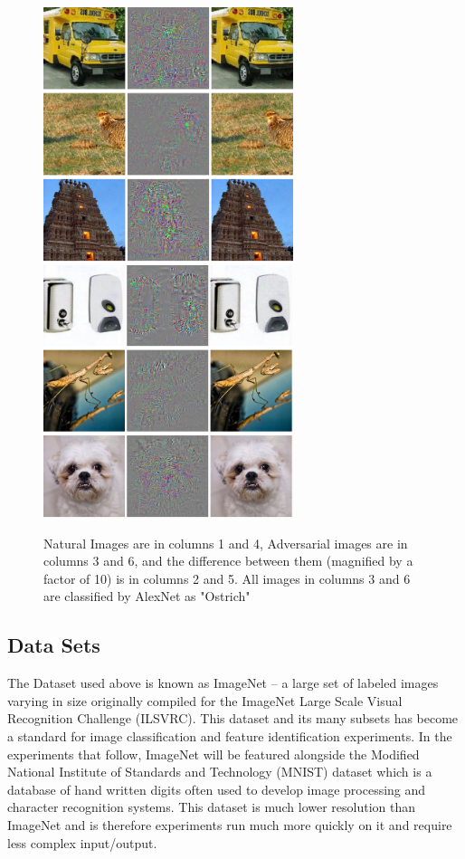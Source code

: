 \documentclass[10pt]{extarticle}
\newcounter{col}
\begin{document}
\begin{figure}[H]
    \centering
\includegraphics[width=7.3cm]{szegedy/negative1.png}\includegraphics[width=7.3cm]{szegedy/negative2.png}
    \caption{Natural Images are in columns 1 and 4, Adversarial images are in columns 3 and 6, and the difference between them (magnified by a factor of 10) is in columns 2 and 5. All images in columns 3 and 6 are classified by AlexNet as "Ostrich" \cite{Szegedy2013}}
    \label{fig:my_label}
\end{figure}

\subsection{Data Sets}

The Dataset used above is known as ImageNet -- a large set of labeled images varying in size originally compiled for the ImageNet Large Scale Visual Recognition Challenge (ILSVRC). This dataset and its many subsets has become a standard for image classification and feature identification experiments. In the experiments that follow, ImageNet will be featured alongside the Modified National Institute of Standards and Technology (MNIST) dataset which is a database of hand written digits often used to develop image processing and character recognition systems. This dataset is much lower resolution than ImageNet and is therefore experiments run much more quickly on it and require less complex input/output.  
\end{document}
